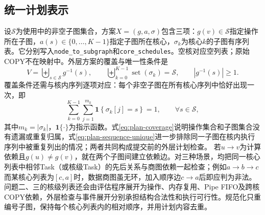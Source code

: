 \subsection{统一计划表示}
设$\mathcal S$为使用中的非空子图集合，方案$X=(g,a,\sigma)$包含三项：$g(v)\in\mathcal S$指定操作所在子图，$a(s)\in\{0,\ldots,K-1\}$指定子图所在核心，$\sigma_k$为核心$k$的子图有序列表。它分别写入\texttt{node\_to\_subgraph}和\texttt{core\_schedules}。空核对应空列表；原始COPY不在映射中。外层方案的覆盖与唯一性条件是
\begin{equation}
V=\biguplus_{s\in\mathcal S}g^{-1}(s),\qquad
\biguplus_{k=0}^{K-1}\operatorname{set}(\sigma_k)=\mathcal S,
\qquad |g^{-1}(s)|\ge1.
\label{eq:plan-coverage}
\end{equation}
覆盖条件还需与核内序列逐项对应：每个非空子图在所有核心序列中恰好出现一次，即
\begin{equation}
\sum_{k=0}^{K-1}\sum_{j=1}^{m_k}
\mathbf 1\!\left\{\sigma_k[j]=s\right\}=1,
\qquad \forall s\in\mathcal S,
\label{eq:plan-sequence-unique}
\end{equation}
其中$m_k=|\sigma_k|$，$\mathbf 1\{\cdot\}$为指示函数。式\eqref{eq:plan-coverage}说明操作集合和子图集合没有遗漏或重复归属，式\eqref{eq:plan-sequence-unique}进一步排除同一子图在核内执行序列中被重复列出的情况；两者共同构成提交前的外层计划检查。
若$u\to v$为计算依赖且$g(u)\ne g(v)$，就在两个子图间建立依赖边。对三种场景，均把同一核心列表中相邻Task（或核级Task）的先后关系与商图依赖一起检查；例如$a\to b\to c$而某核心列表为$[c,a]$时，数据商图虽无环，加入顺序边$c\to a$后即应判为非法。问题二、三的核级列表还会由评估程序展开为操作、内存复用、Pipe FIFO及跨核COPY依赖，外层检查与事件展开分别承担结构合法性和执行可行性。规范化只重编号子图，保持每个核心列表内的相对顺序，并用计划内容去重。
